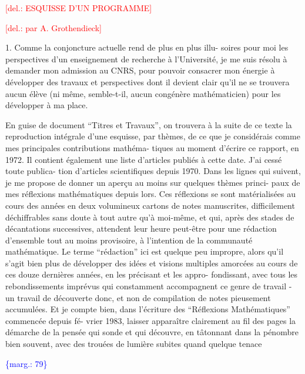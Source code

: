 \documentclass[11pt]{article}
\newcommand{\scanpage}[1]{\par\bigskip\noindent{\small\sffamily[scan #1]}\par}
\newcommand{\mspage}[1]{{\small\sffamily[p.\,#1]}}
\newcommand{\margin}[1]{\textcolor{blue}{\{\textsf{marg.:} #1\}}}
\newcommand{\deleted}[1]{\textcolor{red}{[\textsf{del.:} #1]}}
\begin{document}
\deleted{ESQUISSE D'UN PROGRAMME}

\deleted{par A. Grothendieck}

1. Comme la conjoncture actuelle rend de plus en plus illu-%
soires pour moi les perspectives d'un enseignement de recherche à
l'Université, je me suis résolu à demander mon admission au CNRS, pour
pouvoir consacrer mon énergie à développer des travaux et perspectives
dont il devient clair qu'il ne se trouvera aucun élève (ni même,
semble-t-il, aucun congénère mathématicien) pour les développer à ma
place.

En guise de document ``Titres et Travaux'', on trouvera à la
suite de ce texte la reproduction intégrale d'une esquisse, par thèmes,
de ce que je considérais comme mes principales contributions mathéma-%
tiques au moment d'écrire ce rapport, en 1972. Il contient également
une liste d'articles publiés à cette date. J'ai cessé toute publica-%
tion d'articles scientifiques depuis 1970. Dans les lignes qui suivent,
je me propose de donner un aperçu au moins sur quelques thèmes princi-%
paux de mes réflexions mathématiques depuis lors. Ces réflexions se
sont matérialisées au cours des années en deux volumineux cartons de
notes manuscrites, difficilement déchiffrables sans doute à tout autre
qu'à moi-même, et qui, après des stades de décantations successives,
attendent leur heure peut-être pour une rédaction d'ensemble tout au
moins provisoire, à l'intention de la communauté mathématique. Le
terme ``rédaction'' ici est quelque peu impropre, alors qu'il s'agit
bien plus de développer des idées et visions multiples amorcées au
cours de ces douze dernières années, en les précisant et les appro-%
fondissant, avec tous les rebondissements imprévus qui constamment
accompagnent ce genre de travail - un travail de découverte donc, et
non de compilation de notes pieusement accumulées. Et je compte bien,
dans l'écriture des ``Réflexions Mathématiques'' commencée depuis fé-%
vrier 1983, laisser apparaître clairement au fil des pages la démarche
de la pensée qui sonde et qui découvre, en tâtonnant dans la pénombre
bien souvent, avec des trouées de lumière subites quand quelque tenace

\margin{79}

\clearpage
\scanpage{119/80}
\mspage{2}
\end{document}
